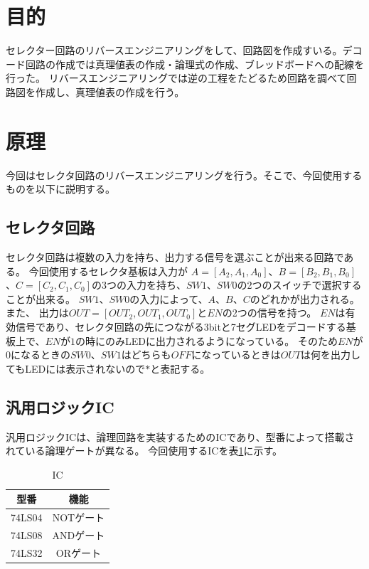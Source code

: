 \documentclass[a4paper,11pt]{ltjsarticle}
\begin{document}
\section{目的}
セレクター回路のリバースエンジニアリングをして、回路図を作成すいる。デコード回路の作成では真理値表の作成・論理式の作成、ブレッドボードへの配線を行った。
リバースエンジニアリングでは逆の工程をたどるため回路を調べて回路図を作成し、真理値表の作成を行う。
\section{原理}
今回はセレクタ回路のリバースエンジニアリングを行う。そこで、今回使用するものを以下に説明する。
\subsection{セレクタ回路}
セレクタ回路は複数の入力を持ち、出力する信号を選ぶことが出来る回路である。
今回使用するセレクタ基板は入力が $A = [A_2, A_1, A_0]$、$B = [B_2, B_1, B_0]$、$C = [C_2, C_1, C_0]$の3つの入力を持ち、$SW1$、$SW0$の2つのスイッチで選択することが出来る。
$SW1$、$SW0$の入力によって、$A$、$B$、$C$のどれかが出力される。また、
出力は$OUT = [OUT_2,OUT_1,OUT_0]$と$EN$の2つの信号を持つ。
$EN$は有効信号であり、セレクタ回路の先につながる3bitと7セグLEDをデコードする基板上で、$EN$が$1$の時にのみLEDに出力されるようになっている。
そのため$EN$が$0$になるときの$SW0$、$SW1$はどちらも$OFF$になっているときは$OUT$は何を出力してもLEDには表示されないので$*$と表記する。
\subsection{汎用ロジックIC}
汎用ロジックICは、論理回路を実装するためのICであり、型番によって搭載されている論理ゲートが異なる。
今回使用するICを表\ref{tab:IC}に示す。
\begin{table}[htbp]
  \centering
  \caption{IC}
  \begin{tabular}{|c|c|}
    \hline
    型番  &  機能  \\
    \hline
    74LS04 & NOTゲート \\
    74LS08 & ANDゲート \\
    74LS32 & ORゲート \\
    \hline
  \end{tabular}
  \label{tab:IC}
\end{table}
\end{document}

